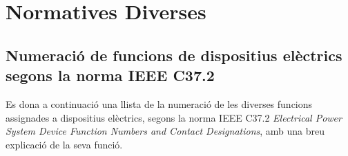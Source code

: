 \chapter{Normatives Diverses}\label{sec:normes}

\section{Numeració de funcions de dispositius elèctrics segons la norma IEEE C37.2 }\label{sec:ieee-c37-2}

Es dona a continuació una llista de la numeració de les diverses funcions assignades a dispositius
elèctrics, segons la norma IEEE C37.2 \textit{Electrical Power System Device Function Numbers and Contact Designations}, amb una breu
explicació de la seva funció.

